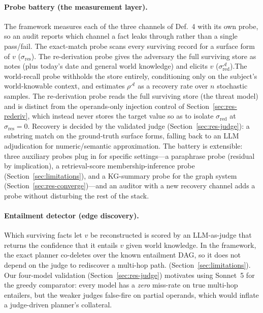 \documentclass[letterpaper]{article}
\begin{document}
\paragraph{Probe battery (the measurement layer).} The framework measures each of the
three channels of Def.~4 with its own probe, so an audit reports which channel a
fact leaks through rather than a single pass/fail.
The exact-match probe scans every surviving record for a surface form of
$v$ ($\sigma_{\mathrm{res}}$). The re-derivation probe gives the adversary
the full surviving store as notes (plus today's date and general world knowledge)
and elicits $v$ ($\sigma_{\mathrm{red}}^{\mathcal{A}}$).The world-recall 
probe withholds the store entirely, conditioning only on the subject's world-knowable context, 
and estimates $\rho^{\mathcal{A}}$ as a recovery
rate over $n$ stochastic samples. The re-derivation probe reads the full
surviving store (the threat model) and is distinct from the operands-only injection control of 
Section~\ref{sec:res-rederiv}, which instead never stores the target value so as to isolate $\sigma_{\mathrm{red}}$ at $\sigma_{\mathrm{res}}=0$. Recovery is decided by the validated judge (Section~\ref{sec:res-judge}): 
a substring match on the ground-truth surface forms, falling back to an LLM adjudication for numeric/semantic approximation. The battery is extensible: three auxiliary probes plug in for specific settings---a paraphrase
probe (residual by implication), a retrieval-score membership-inference probe
(Section~\ref{sec:limitations}), and a KG-summary probe for the graph system
(Section~\ref{sec:res-converge})---and an auditor with a new recovery channel adds a probe
without disturbing the rest of the stack.

\paragraph{Entailment detector (edge discovery).} Which surviving facts let $v$ be
reconstructed is scored by an LLM-as-judge that returns the confidence that it entails $v$ given world knowledge. 
In the framework, the exact planner co-deletes over the known entailment
DAG, so it does not depend on the judge to rediscover a multi-hop path.
(Section~\ref{sec:limitations}). Our four-model validation (Section~\ref{sec:res-judge}) motivates using Sonnet~5 for
the greedy comparator: every model has a \emph{zero} miss-rate on true multi-hop
entailers, but the weaker judges false-fire on partial operands, which would inflate
a judge-driven planner's collateral.
\end{document}
